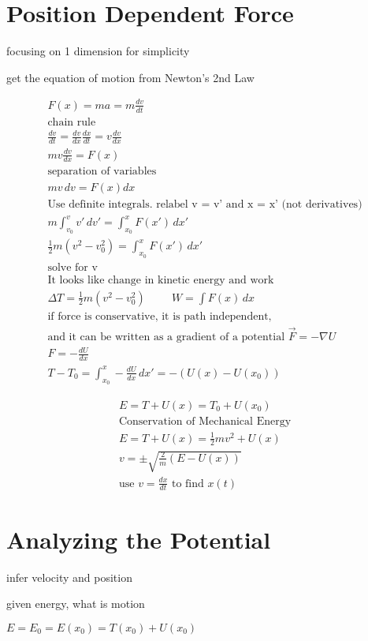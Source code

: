 \documentclass[fleqn]{report}
\newcommand{\hp}{\hspace{1cm}}
\newcommand{\equations} [1] {
\begin{gather*}
#1
\end{gather*}
}
\begin{document}
\section{Position Dependent Force}
focusing on 1 dimension for simplicity

get the equation of motion from Newton's 2nd Law

\equations{
F(x) = m a = m \frac{dv}{dt}
\\
\textrm{chain rule}
\\
\frac{dv}{dt} = \frac{dv}{dx} \frac{dx}{dt} = v \frac{dv}{dx}
\\
m v \frac{dv}{dx} = F(x)
\\
\textrm{separation of variables}
\\
mv \, dv = F(x) dx
\\
\textrm{Use definite integrals. relabel v = v' and x = x' (not derivatives)}
\\
m \int^v_{v_0} v' \, dv' = \int^x_{x_0} F(x') \, dx' 
\\
\frac{1}{2} m(v^2 - v_0^2) = \int^x_{x_0} F(x') \, dx'
\\
\textrm{solve for v}
\\
\textrm{It looks like change in kinetic energy and work}
\\
\Delta T = \frac{1}{2} m (v^2 - v_0^2) \hp W = \int F(x) \, dx
\\
\textrm{if force is conservative, it is path independent, }
\\
\textrm{and it can be written as a
gradient of a potential $\vec F = -\nabla U$}
\\
F = -\frac{dU}{dx}
\\
T - T_0 = \int^x_{x_0} - \frac{dU}{dx} \, dx' = - \left( U(x) - U(x_0) \right)
}
\equations{
E = T + U(x) = T_0 + U(x_0)
\\
\textrm{Conservation of Mechanical Energy}
\\
E = T + U(x) = \frac{1}{2} mv^2 + U(x)
\\
v = \pm \sqrt{\frac{2}{m} (E - U(x))}
\\
\textrm{use $v = \frac{dx}{dt}$ to find $x(t)$}
}

\section{Analyzing the Potential}
infer velocity and position

given energy, what is motion

$E = E_0 = E(x_0) = T(x_0) + U(x_0)$
\end{document}

